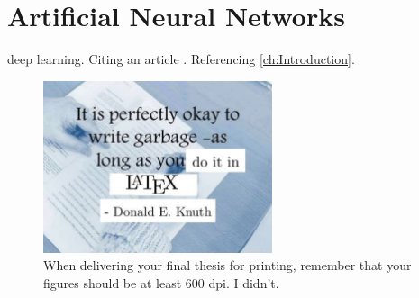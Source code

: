 \section{Artificial Neural Networks}
\label{sec:ANN}

\gls{deep learning}. Citing an article \citep{Bojarski2016}. Referencing \autoref{ch:Introduction}. 
\lipsum[9-13] 

\begin{figure}[htp]
    \centering
    \includegraphics[width=0.6\textwidth]{figs/background/truth.png}
    \caption{When delivering your final thesis for printing, remember that your figures should be at least $600$ \gls{dpi}. I didn't.}
    \label{fig:my_label}
\end{figure}